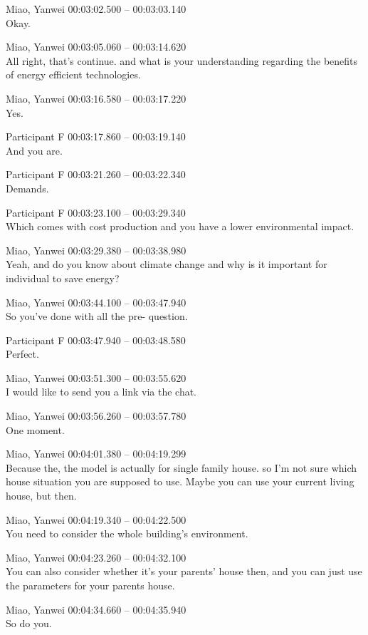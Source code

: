 {Miao, Yanwei 00:03:02.500 -- 00:03:03.140 \\
Okay.

Miao, Yanwei 00:03:05.060 -- 00:03:14.620 \\
All right, that's continue. and what is your understanding regarding the benefits of energy efficient technologies.

Miao, Yanwei 00:03:16.580 -- 00:03:17.220 \\
Yes.

Participant F 00:03:17.860 -- 00:03:19.140 \\
And you are.

Participant F 00:03:21.260 -- 00:03:22.340 \\
Demands.

Participant F 00:03:23.100 -- 00:03:29.340 \\
Which comes with cost production and you have a lower environmental impact.

Miao, Yanwei 00:03:29.380 -- 00:03:38.980 \\
Yeah, and do you know about climate change and why is it important for individual to save energy?

Miao, Yanwei 00:03:44.100 -- 00:03:47.940 \\
So you've done with all the pre- question.

Participant F 00:03:47.940 -- 00:03:48.580 \\
Perfect.

Miao, Yanwei 00:03:51.300 -- 00:03:55.620 \\
I would like to send you a link via the chat.

Miao, Yanwei 00:03:56.260 -- 00:03:57.780 \\
One moment.

Miao, Yanwei 00:04:01.380 -- 00:04:19.299 \\
Because the, the model is actually for single family house. so I'm not sure which house situation you are supposed to use. Maybe you can use your current living house, but then.

Miao, Yanwei 00:04:19.340 -- 00:04:22.500 \\
You need to consider the whole building's environment.

Miao, Yanwei 00:04:23.260 -- 00:04:32.100 \\
You can also consider whether it's your parents' house then, and you can just use the parameters for your parents house.

Miao, Yanwei 00:04:34.660 -- 00:04:35.940 \\
So do you.

}
